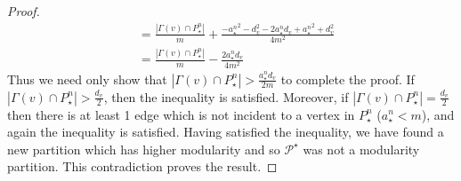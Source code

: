 \documentclass[]{article}
\begin{document}
\begin{proof}
\begin{equation}
\begin{split}
					&= \frac{|\Gamma(v)\cap P_\star^{n}|}{m}+\frac{-{a^n_\star}^2-d_v^2-2a^n_\star d_v+{a^n_\star}^2+d_v^2}{4m^2}\\
					&=\frac{|\Gamma(v)\cap P_\star^{n}|}{m}-\frac{2a^n_\star d_v}{4m^2}
				\end{split}
			\end{equation} 
		Thus we need only show that $|\Gamma(v)\cap P_\star^n|>\frac{a_\star^nd_v}{2m}$ to complete the proof. If $|\Gamma(v)\cap P_\star^n|> \frac{d_v}{2}$, then the inequality is satisfied. Moreover, if $|\Gamma(v)\cap P_\star^n|=\frac{d_v}{2}$ then there is at least 1 edge which is not incident to a vertex in $P_\star^n$ ($a_\star^n<m$), and again the inequality is satisfied. Having satisfied the inequality, we have found a new partition which has higher modularity and so $\mathcal{P}^\star$ was not a modularity partition. This contradiction proves the result.
		\end{proof}
\end{document}
